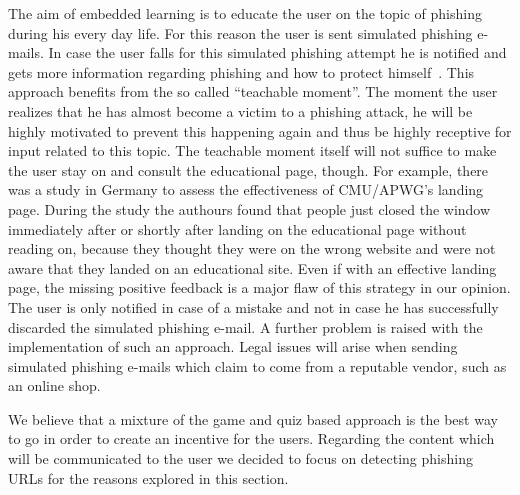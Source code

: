 \begin{description}[leftmargin=0cm]
	\item[Emdedded Learning] The aim of embedded learning is to educate the user on the topic of phishing during his every day life.
 For this reason the user is sent simulated phishing e-mails.
 In case the user falls for this simulated phishing attempt he is notified and gets more information regarding phishing and how to protect himself~\cite{embedded2011jansson, kumaraguru2009phishguru}. 
This approach benefits from the so called ``teachable moment''. 
The moment the user realizes that he has almost become a victim to a phishing attack, he will be highly motivated to prevent this happening again and thus be highly receptive for input related to this topic.
 The teachable moment itself will not suffice to make the user stay on and consult the educational page, though.
 For example, there was a study in Germany to assess the effectiveness of CMU/APWG's landing page. 
 During the study the authours found that people just closed the window immediately after or shortly after landing on the educational page without reading on,  because they thought they were on the wrong website and were not aware that they landed on an educational site.
 Even if with an effective landing page, the missing positive feedback is a major flaw of this strategy in our opinion.
 The user is only notified in case of a mistake and not in case he has successfully discarded the simulated phishing e-mail.
 A further problem is raised with the implementation of such an approach.
 Legal issues will arise when sending simulated phishing e-mails which claim to come from a reputable vendor, such as an online shop.

\end{description}

We believe that a mixture of the game and quiz based approach is the best way to go in order to create an incentive for the users. 
Regarding the content which will be communicated to the user we decided to focus on detecting phishing URLs for the reasons explored in this section.
